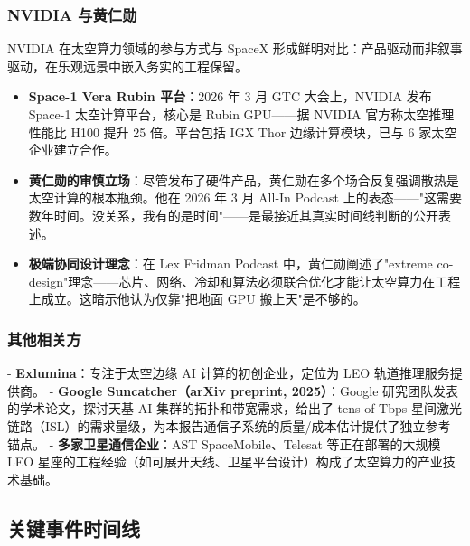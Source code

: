 \subsubsection{NVIDIA 与黄仁勋}

NVIDIA 在太空算力领域的参与方式与 SpaceX 形成鲜明对比：产品驱动而非叙事驱动，在乐观远景中嵌入务实的工程保留。

\begin{itemize}[leftmargin=*]
    \item \textbf{Space-1 Vera Rubin 平台}：2026 年 3 月 GTC 大会上，NVIDIA 发布 Space-1 太空计算平台，核心是 Rubin GPU——据 NVIDIA 官方称太空推理性能比 H100 提升 25 倍。平台包括 IGX Thor 边缘计算模块，已与 6 家太空企业建立合作\cite{huang2026gtc}。
    \item \textbf{黄仁勋的审慎立场}：尽管发布了硬件产品，黄仁勋在多个场合反复强调散热是太空计算的根本瓶颈。他在 2026 年 3 月 All-In Podcast 上的表态——"这需要数年时间。没关系，我有的是时间"——是最接近其真实时间线判断的公开表述\cite{huang2026allin}。
    \item \textbf{极端协同设计理念}：在 Lex Fridman Podcast 中，黄仁勋阐述了"extreme co-design"理念——芯片、网络、冷却和算法必须联合优化才能让太空算力在工程上成立。这暗示他认为仅靠"把地面 GPU 搬上天"是不够的\cite{huang2026lex}。
\end{itemize}

\subsubsection{其他相关方}

- \textbf{Exlumina}：专注于太空边缘 AI 计算的初创企业，定位为 LEO 轨道推理服务提供商。
- \textbf{Google Suncatcher（arXiv preprint, 2025）}：Google 研究团队发表的学术论文，探讨天基 AI 集群的拓扑和带宽需求，给出了 tens of Tbps 星间激光链路（ISL）的需求量级，为本报告通信子系统的质量/成本估计提供了独立参考锚点。
- \textbf{多家卫星通信企业}：AST SpaceMobile、Telesat 等正在部署的大规模 LEO 星座的工程经验（如可展开天线、卫星平台设计）构成了太空算力的产业技术基础。

\subsection{关键事件时间线}

